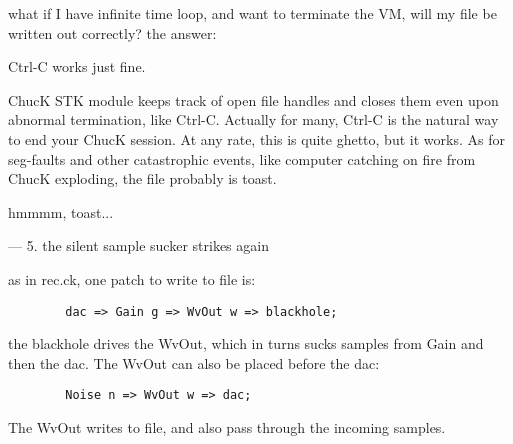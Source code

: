 what if I have infinite time loop, and want to terminate
the VM, will my file be written out correctly?  the answer:

Ctrl-C works just fine.

ChucK STK module keeps track of open file handles and
closes them even upon abnormal termination, like Ctrl-C.
Actually for many, Ctrl-C is the natural way to end your
ChucK session.  At any rate, this is quite ghetto, but it works.
As for seg-faults and other catastrophic events, like computer
catching on fire from ChucK exploding, the file probably is
toast.

hmmmm, toast...


---
5. the silent sample sucker strikes again

as in rec.ck, one patch to write to file is:
\begin{verbatim}
        dac => Gain g => WvOut w => blackhole;
\end{verbatim}
the blackhole drives the WvOut, which in turns sucks
samples from Gain and then the dac.  The WvOut
can also be placed before the dac:
\begin{verbatim}
        Noise n => WvOut w => dac;
\end{verbatim}
The WvOut writes to file, and also pass through the incoming samples.
